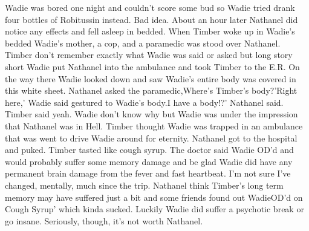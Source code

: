 \documentclass[12pt]{book}
\begin{document}
Wadie was bored one night and couldn't score some bud so Wadie tried drank four bottles of Robitussin instead. Bad idea. About an hour later Nathanel did notice any effects and fell asleep in bedded. When Timber woke up in Wadie's bedded Wadie's mother, a cop, and a paramedic was stood over Nathanel. Timber don't remember exactly what Wadie was said or asked but long story short Wadie put Nathanel into the ambulance and took Timber to the E.R. On the way there Wadie looked down and saw Wadie's entire body was covered in this white sheet. Nathanel asked the paramedic,Where's Timber's body?'Right here,' Wadie said gestured to Wadie's body.I have a body!?' Nathanel said. Timber said yeah. Wadie don't know why but Wadie was under the impression that Nathanel was in Hell. Timber thought Wadie was trapped in an ambulance that was went to drive Wadie around for eternity. Nathanel got to the hospital and puked. Timber tasted like cough syrup. The doctor said Wadie OD'd and would probably suffer some memory damage and be glad Wadie did have any permanent brain damage from the fever and fast heartbeat. I'm not sure I've changed, mentally, much since the trip. Nathanel think Timber's long term memory may have suffered just a bit and some friends found out WadieOD'd on Cough Syrup' which kinda sucked. Luckily Wadie did suffer a psychotic break or go insane. Seriously, though, it's not worth Nathanel.
\end{document}
